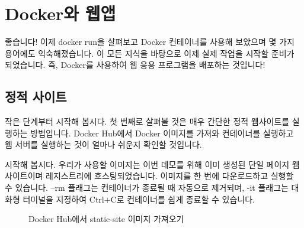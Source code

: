 \chapter{Docker와 웹앱}
좋습니다! 이제 docker run을 살펴보고 Docker 컨테이너를 사용해 보았으며 몇 가지 용어에도 익숙해졌습니다. 이 모든 지식을 바탕으로 이제 실제 작업을 시작할 준비가 되었습니다. 즉, Docker를 사용하여 웹 응용 프로그램을 배포하는 것입니다!

\section{정적 사이트}
작은 단계부터 시작해 봅시다. 첫 번째로 살펴볼 것은 매우 간단한 정적 웹사이트를 실행하는 방법입니다. Docker Hub에서 Docker 이미지를 가져와 컨테이너를 실행하고 웹 서버를 실행하는 것이 얼마나 쉬운지 확인할 것입니다.

시작해 봅시다. 우리가 사용할 이미지는 이번 데모를 위해 이미 생성된 단일 페이지 웹사이트이며 레지스트리에 호스팅되었습니다. 이미지를 한 번에 다운로드하고 실행할 수 있습니다. --rm 플래그는 컨테이너가 종료될 때 자동으로 제거되며, -it 플래그는 대화형 터미널을 지정하여 Ctrl+C로 컨테이너를 쉽게 종료할 수 있습니다.

\begin{figure}[h]
  \centering
  \hfill
  \caption{Docker Hub에서 static-site 이미지 가져오기}
  \label{fig:mainfig}
\end{figure}

